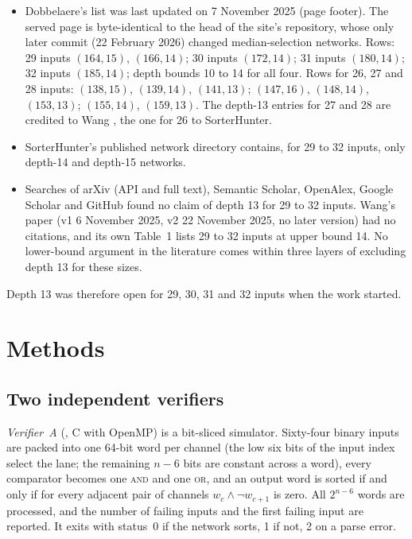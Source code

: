 \documentclass[11pt,a4paper]{article}
\theoremstyle{plain}
\theoremstyle{definition}
\theoremstyle{remark}
\newcommand{\dob}{Dobbelaere's list}
\begin{document}
\begin{itemize}
\item \dob{} was last updated on 7 November 2025 (page footer). The served page is byte-identical to the head of the site's repository, whose only later commit (22 February 2026) changed median-selection networks. Rows: 29 inputs $(164,15)$, $(166,14)$; 30 inputs $(172,14)$; 31 inputs $(180,14)$; 32 inputs $(185,14)$; depth bounds 10 to 14 for all four. Rows for 26, 27 and 28 inputs: $(138,15)$, $(139,14)$, $(141,13)$; $(147,16)$, $(148,14)$, $(153,13)$; $(155,14)$, $(159,13)$. The depth-13 entries for 27 and 28 are credited to Wang \cite{Wang25}, the one for 26 to SorterHunter.
\item SorterHunter's published network directory \cite{SorterHunter} contains, for 29 to 32 inputs, only depth-14 and depth-15 networks.
\item Searches of arXiv (API and full text), Semantic Scholar, OpenAlex, Google Scholar and GitHub found no claim of depth 13 for 29 to 32 inputs. Wang's paper \cite{Wang25} (v1 6 November 2025, v2 22 November 2025, no later version) had no citations, and its own Table~1 lists 29 to 32 inputs at upper bound 14. No lower-bound argument in the literature comes within three layers of excluding depth 13 for these sizes.
\end{itemize}

Depth 13 was therefore open for 29, 30, 31 and 32 inputs when the work started.

\section{Methods}\label{sec:methods}

\subsection{Two independent verifiers}\label{sec:verifiers}

\emph{Verifier~A} (, C with OpenMP) is a bit-sliced simulator. Sixty-four binary inputs are packed into one 64-bit word per channel (the low six bits of the input index select the lane; the remaining $n-6$ bits are constant across a word), every comparator becomes one \textsc{and} and one \textsc{or}, and an output word is sorted if and only if for every adjacent pair of channels $w_c \wedge \neg w_{c+1}$ is zero. All $2^{n-6}$ words are processed, and the number of failing inputs and the first failing input are reported. It exits with status~0 if the network sorts, 1 if not, 2 on a parse error.
\end{document}
